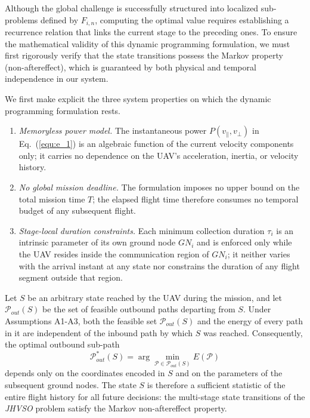 Although the global challenge is successfully structured into localized sub-problems defined by $F_{i,n}$, computing the optimal value requires establishing a recurrence relation that links the current stage to the preceding ones.
To ensure the mathematical validity of this dynamic programming formulation, we must first rigorously verify that the state transitions possess the Markov property (non-aftereffect), which is guaranteed by both physical and temporal independence in our system.

We first make explicit the three system properties on which the dynamic programming formulation rests.

\begin{enumerate}
    \item \textit{Memoryless power model.}
    The instantaneous power $P(v_{\parallel}, v_{\perp})$ in Eq.~(\ref{equ:e_1}) is an algebraic function of the current velocity components only; it carries no dependence on the UAV's acceleration, inertia, or velocity history.  
    \item \textit{No global mission deadline.}
    The formulation imposes no upper bound on the total mission time $T$; the elapsed flight time therefore consumes no temporal budget of any subsequent flight.
    \item \textit{Stage-local duration constraints.}
    Each minimum collection duration $\tau_i$ is an intrinsic parameter of its own ground node $GN_i$ and is enforced only while the UAV resides inside the communication region of $GN_i$; it neither varies with the arrival instant at any state nor constrains the duration of any flight segment outside that region.
\end{enumerate}

\begin{theorem}
    \label{thm:aftereffect}
    Let $S$ be an arbitrary state reached by the UAV during the mission, and let $\mathcal{P}_{out}(S)$ be the set of feasible outbound paths departing from $S$.
    Under Assumptions A1-A3, both the feasible set $\mathcal{P}_{out}(S)$ and the energy of every path in it are independent of the inbound path by which $S$ was reached.
    Consequently, the optimal outbound sub-path
    \[
    \mathcal{P}^{*}_{out}(S) = \arg\min_{\mathcal{P} \in \mathcal{P}_{out}(S)} E(\mathcal{P})
    \]
    depends only on the coordinates encoded in $S$ and on the parameters of the subsequent ground nodes.
    The state $S$ is therefore a sufficient statistic of the entire flight history for all future decisions: the multi-stage state transitions of the \textit{JHVSO} problem satisfy the Markov non-aftereffect property.

\end{theorem}

